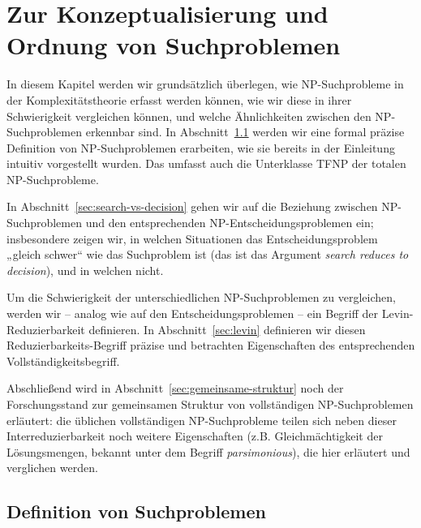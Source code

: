 \chapter{Zur Konzeptualisierung und Ordnung von Suchproblemen}\label{chap:searchproblems}

In diesem Kapitel werden wir grundsätzlich überlegen, wie NP-Suchprobleme in der Komplexitätstheorie erfasst werden können, wie wir diese in ihrer Schwierigkeit vergleichen können, und welche Ähnlichkeiten zwischen den NP-Suchproblemen erkennbar sind. 
In Abschnitt~\ref{sec:searchproblems-def} werden wir eine formal präzise Definition von NP-Suchproblemen erarbeiten, wie sie bereits in der Einleitung intuitiv vorgestellt wurden. Das umfasst auch die Unterklasse TFNP der totalen NP-Suchprobleme.

In Abschnitt~\ref{sec:search-vs-decision} gehen wir auf die Beziehung zwischen NP-Suchproblemen und den entsprechenden NP-Entscheidungsproblemen ein; insbesondere zeigen wir, in welchen Situationen das Entscheidungsproblem „gleich schwer“ wie das Suchproblem ist (das ist das Argument \emph{search reduces to decision}), und in welchen nicht.

Um die Schwierigkeit der unterschiedlichen NP-Suchproblemen zu vergleichen, werden wir – analog wie auf den Entscheidungsproblemen – ein Begriff der Levin-Reduzierbarkeit definieren. In Abschnitt~\ref{sec:levin} definieren wir diesen Reduzierbarkeits-Begriff präzise und betrachten Eigenschaften des entsprechenden Vollständigkeitsbegriff.

Abschließend wird in Abschnitt~\ref{sec:gemeinsame-struktur} noch der Forschungsstand zur gemeinsamen Struktur von vollständigen NP-Suchproblemen erläutert: die üblichen vollständigen NP-Suchprobleme teilen sich neben dieser Interreduzierbarkeit noch weitere Eigenschaften (z.B. Gleichmächtigkeit der Lösungsmengen, bekannt unter dem Begriff \emph{parsimonious}), die hier erläutert und verglichen werden. 

\section{Definition von Suchproblemen}\label{sec:searchproblems-def}

